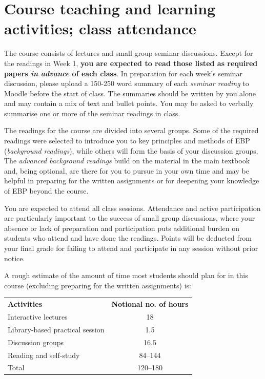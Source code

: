 \documentclass[a4paper, 11pt]{article}
\begin{document}
\section*{Course teaching and learning activities; class attendance}

The course consists of lectures and small group
seminar discussions. Except for the readings in Week 1, \textbf{you are expected to read those listed as required papers 
\emph{in advance} of each class}. In preparation for each week's seminar discussion, please upload a 150-250 word summary of each \emph{seminar reading} to Moodle before the start of class. The summaries should be written by you alone and may contain a mix of text and bullet points. You may be asked to verbally summarise one or more of the seminar readings in class. 

The readings for the course are divided into several groups. Some of the required
readings were selected to introduce you to key principles and methods of EBP (\emph{background readings}), while others will form the basis of your discussion
groups. The \emph{advanced background readings} build on the material in the
main textbook and, being optional, are there for you to pursue in your own time and
may be helpful in preparing for the written assignments or for deepening your
knowledge of EBP beyond the course.

You are expected to attend all class sessions. Attendance and active participation are particularly important to the success of small group discussions, where your absence or lack of preparation and participation puts additional burden on students who attend and have done the readings. Points will be deducted from your final grade for failing to attend and participate in any session without prior notice. 

A rough estimate of the amount of time most students should plan for in this course (excluding preparing for the written assignments) is:

\begin{center}
\begin{tabular}{l c}
\textbf{Activities} & \textbf{Notional no. of hours} \\
Interactive lectures & 18 \\
Library-based practical session & 1.5 \\
Discussion groups & 16.5\\
Reading and self-study & 84--144 \\
Total & 120--180 \\
\end{tabular}
\end{center}
\end{document}
